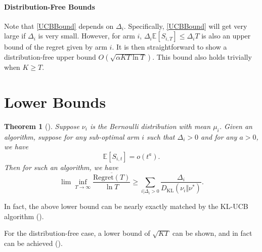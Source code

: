 \documentclass[openany]{book}
\newtheorem{theorem}{Theorem}[chapter]
\theoremstyle{definition}
\theoremstyle{remark}
\begin{document}
\paragraph{Distribution-Free Bounds}
Note that \eqref{UCBBound} depends on $\Delta_i$. Specifically, \eqref{UCBBound} will get very large if $\Delta_i$ is very small. However, for arm $i$, $\Delta_i \mathbb{E}[S_{i,T}]\le\Delta_iT$ is also an upper bound of the regret given by arm $i$. It is then straightforward to show a distribution-free upper bound $O(\sqrt{\alpha KT\ln T})$. This bound also holds trivially when $K\ge  T$.

\section{Lower Bounds}
\begin{theorem}[\cite{LR85}]
    Suppose $\nu_i$ is the Bernoulli distribution with mean $\mu_i$. Given an algorithm, suppose for any sub-optimal arm $i$ such that $\Delta_i>0$ and for any $a>0$, we have
    \begin{equation}
        \mathbb{E}[S_{i,t}]=o(t^a).
    \end{equation}
    Then for such an algorithm, we have
    \begin{equation}
        \lim\inf_{T\to\infty}\frac{\overline{\mathrm{Regret}(T)}}{\ln T}\ge \sum_{i|\Delta_i>0}^{}\frac{\Delta_i}{D_{\mathrm{KL}}(\nu_i\Vert\nu^*)}.
    \end{equation}
\end{theorem}
In fact, the above lower bound can be nearly exactly matched by the KL-UCB algorithm (\cite{GC11}\cite{MMS11}).

For the distribution-free case, a lower bound of $\sqrt{KT}$ can be shown, and in fact can be achieved (\cite{AB09}).
\end{document}
